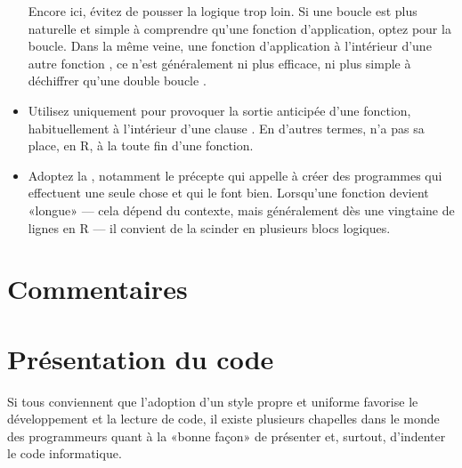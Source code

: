 \begin{itemize}
  Encore ici, évitez de pousser la logique trop loin. Si une boucle
  est plus naturelle et simple à comprendre qu'une fonction
  d'application, optez pour la boucle. Dans la même veine, une
  fonction d'application  à l'intérieur d'une autre
  fonction , ce n'est généralement ni plus efficace, ni
  plus simple à déchiffrer qu'une double boucle .
\item Utilisez  uniquement pour provoquer la sortie
  anticipée d'une fonction, habituellement à l'intérieur d'une clause
  . En d'autres termes,  n'a pas sa place, en R,
  à la toute fin d'une fonction.
\item Adoptez la
  , notamment le précepte qui appelle à créer des programmes
  qui effectuent une seule chose et qui le font bien. Lorsqu'une
  fonction devient «longue» --- cela dépend du contexte, mais
  généralement dès une vingtaine de lignes en R --- il convient de la
  scinder en plusieurs blocs logiques.
\end{itemize}




\section{Commentaires}
\label{sec:collaboration:commentaires}


\section{Présentation du code}
\label{sec:collaboration:presentation}

Si tous conviennent que l'adoption d'un style propre et uniforme
favorise le développement et la lecture de code, il existe plusieurs
chapelles dans le monde des programmeurs quant à la «bonne façon» de
présenter et, surtout, d'indenter le code informatique.

